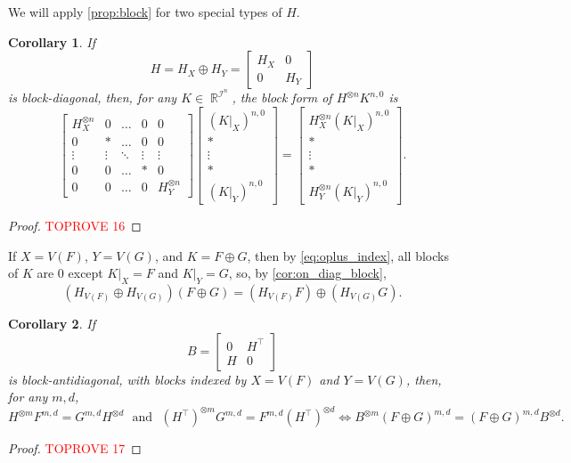 \documentclass{article}
\newtheorem{corollary}{Corollary}[section]
\theoremstyle{remark}
\theoremstyle{definition}
\DeclareMathOperator{\rr}{\mathbb{R}}
\DeclareMathOperator{\ic}{\mathcal{I}}
\begin{document}
We will apply \autoref{prop:block} for two special types of $H$.
\begin{corollary}
    \label{cor:on_diag_block}
    If 
    \[
        H = H_X \oplus H_Y = \begin{bmatrix} H_X & 0 \\ 0 & H_Y\end{bmatrix}
    \]
    is block-diagonal, then, for any $K \in \rr^{\ic^n}$, 
    the block form of $H^{\otimes n} K^{n,0}$ is
    \[
        \begin{bmatrix} 
            H_X^{\otimes n} & 0 & \ldots & 0 & 0\\
            0 & * & \ldots & 0 & 0\\
            \vdots & \vdots & \ddots & \vdots & \vdots \\
            0 & 0 & \ldots & * & 0\\
            0 & 0 & \ldots & 0 & H_Y^{\otimes n}
        \end{bmatrix}
        \begin{bmatrix} 
            (K|_X)^{n,0} \\ * \\ \vdots \\ * \\ (K|_Y)^{n,0}
        \end{bmatrix} =
        \begin{bmatrix} 
            H_X^{\otimes n}(K|_X)^{n,0} \\ * \\ \vdots \\ * \\ H_Y^{\otimes n}(K|_Y)^{n,0}
        \end{bmatrix}.
    \]
\end{corollary}
\begin{proof}\textcolor{red}{TOPROVE 16}\end{proof}
If $X = V(F)$, $Y = V(G)$, and $K = F \oplus G$, then by \eqref{eq:oplus_index},
all blocks of $K$ are 0 except $K|_X = F$ and $K|_Y = G$, so, by \autoref{cor:on_diag_block},
\begin{equation}
    \label{eq:oplus_action}
    (H_{V(F)} \oplus H_{V(G)})(F \oplus G) = (H_{V(F)} F) \oplus (H_{V(G)} G).
\end{equation}

\begin{corollary}
\label{cor:off_diag_block}
If
\[
    B = \begin{bmatrix} 0 & H^\top \\ H & 0 \end{bmatrix}
\]
is block-antidiagonal, with blocks indexed by $X = V(F)$ and $Y = V(G)$, then, for any $m,d$,
\[
    H^{\otimes m}F^{m,d} = G^{m,d}H^{\otimes d} \text{~~and~~}
    (H^\top)^{\otimes m}G^{m,d} = F^{m,d}(H^\top)^{\otimes d}
    \iff 
    B^{\otimes m}(F \oplus G)^{m,d} = (F \oplus G)^{m,d}B^{\otimes d}.
\]
\end{corollary}
\begin{proof}\textcolor{red}{TOPROVE 17}\end{proof}
 
\printbibliography
\end{document}
